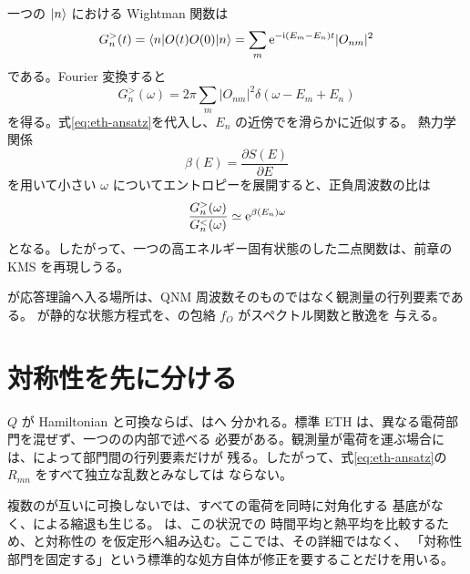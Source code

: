 一つの $\lvert n \rangle$ における Wightman 関数は
\begin{equation}
G_n^>(t)
=
\langle n \rvert O(t)O(0)\lvert n \rangle
=
\sum_m
\mathrm{e}^{-\mathrm{i}(E_m-E_n)t}
|O_{nm}|^2
\label{eq:eigenstate-wightman}
\end{equation}
である。Fourier 変換すると
\begin{equation}
G_n^>(\omega)
=
2\pi
\sum_m
|O_{nm}|^2
\delta\left(
\omega-E_m+E_n
\right)
\label{eq:eigenstate-spectral-sum}
\end{equation}
を得る。式\eqref{eq:eth-ansatz}を代入し、$E_n$ の近傍でを滑らかに近似する。
熱力学関係
\begin{equation}
\beta(E)
=
\frac{\partial S(E)}{\partial E}
\label{eq:microcanonical-beta}
\end{equation}
を用いて小さい $\omega$ についてエントロピーを展開すると、正負周波数の比は
\begin{equation}
\frac{G_n^>(\omega)}{G_n^<(\omega)}
\simeq
\mathrm{e}^{\beta(E_n)\omega}
\label{eq:eth-detailed-balance}
\end{equation}
となる。したがって、一つの高エネルギー固有状態のした二点関数は、前章の
KMS を再現しうる。

\begin{principlebox}
 が応答理論へ入る場所は、QNM 周波数そのものではなく観測量の行列要素である。
が静的な状態方程式を、の包絡 $f_O$ がスペクトル関数と散逸を
与える。
\end{principlebox}

\section{対称性を先に分ける}

 $Q$ が Hamiltonian と可換ならば、はへ
分かれる。標準 ETH は、異なる電荷部門を混ぜず、一つのの内部で述べる
必要がある。観測量が電荷を運ぶ場合には、によって部門間の行列要素だけが
残る。したがって、式\eqref{eq:eth-ansatz}の $R_{mn}$ をすべて独立な乱数とみなしては
ならない。

複数のが互いに可換しないでは、すべての電荷を同時に対角化する
基底がなく、による縮退も生じる。 は、この状況での
時間平均と熱平均を比較するため、と対称性の
を仮定形へ組み込む\cite{Murthy:2023naETH}。ここでは、その詳細ではなく、
「対称性部門を固定する」という標準的な処方自体が修正を要することだけを用いる。

